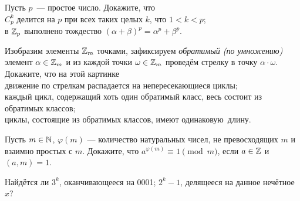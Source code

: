 \documentclass[a4paper, 12pt]{article}
\newcommand{\del}{\mathrel{\raisebox{-.3 ex}{${\vdots}$}}}
\begin{document}
 Пусть $p$~--- простое число. Докажите, что\\
 $C_p^k$ делится на $p$ при всех таких целых $k$, что $1 < k < p$;\\
в $\mathbb{Z}_p$ выполнено тождество $(\alpha + \beta)^p = \alpha^p + \beta^p$.


Изобразим элементы $\mathbb{Z}_m$ точками, зафиксируем
{\it обратимый (по умножению)} элемент $\alpha\in\mathbb{Z}_m$ и из каждой точки
$\omega\in\mathbb{Z}_m$ провед\"ем стрелку в точку $\alpha\cdot \omega$.
Докажите, что на этой картинке \\
 движение по стрелкам распадается на непересекающиеся циклы;\\
 каждый цикл, содержащий хоть один обратимый класс, весь состоит из обратимых классов;\\
 циклы, состоящие из обратимых классов, имеют одинаковую~длину.



Пусть $m\in\mathbb{N}$,
$\varphi(m)$ --- количество натуральных чисел, не превосходящих $m$ и взаимно
простых с $m$.  Докажите, что $a^{\varphi(m)}\equiv1\!\pmod{m}$,
если $a\in\mathbb{Z}$ и $(a,m)=1$.


Найдётся ли  $3^k$, оканчивающееся на 0001;
 $2^k-1$, делящееся на данное нечётное~$x$?


\end{document}
